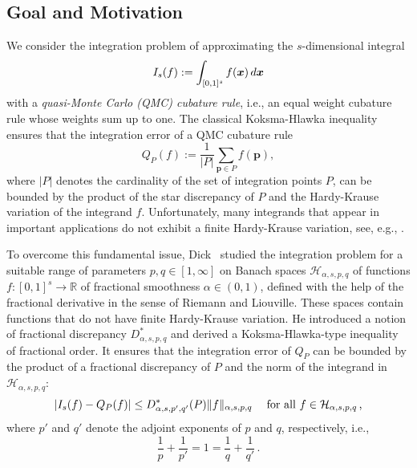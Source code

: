 \documentclass[12pt]{article}
\newcommand{\bsx}{\boldsymbol{x}}
\newcommand{\bsp}{\boldsymbol{p}}
\newcommand{\RR}{\mathbb{R}}
\newcommand{\mig}[1]{\textcolor{blue}{#1}}
\begin{document}


\subsection{Goal and Motivation}


We consider the integration problem of approximating the $s$-dimensional integral
\begin{equation}\label{eq:I_s}
I_s(f) := \int_{[0,1]^s} f(\bsx) \, {\rm}d \bsx
\end{equation}
with a \emph{quasi-Monte Carlo (QMC) cubature rule}, i.e., an equal weight cubature rule whose weights sum up to one. The classical Koksma-Hlawka inequality 
ensures that the integration error of a QMC cubature rule 
\begin{equation}\label{eq:qmc_cub}
Q_P(f) := \frac{1}{|P|} \sum_{\bsp\in P} f(\bsp),
\end{equation}
where $|P|$ denotes the cardinality of the set of integration points $P$, 
can be bounded by the product of the star discrepancy of $P$ and the Hardy-Krause variation of the integrand $f$. Unfortunately, many integrands that appear in important applications do not exhibit a finite Hardy-Krause variation, see, e.g., \cite{Owen05}.

To overcome this fundamental issue, %
Dick~\cite{D08} studied the  integration problem for a suitable range of parameters $p,q \in [1,\infty]$ on Banach spaces $\mathcal{H}_{\alpha, s, p,q}$ of functions $f: [0,1]^s\to \RR$ of fractional smoothness $\alpha \in (0,1)$, defined with the help of the fractional derivative in the sense of Riemann and Liouville. These spaces contain functions that do not have finite Hardy-Krause variation. 
He introduced a notion of fractional discrepancy $D^*_{\alpha,s,p,q}$ and derived a Koksma-Hlawka-type inequality of fractional order. It ensures that the integration error 
of $Q_P$ 
can be bounded by the product of a fractional discrepancy of $P$ and the norm of the integrand in
$\mathcal{H}_{\alpha, s, p,q}$:
$$ |I_s(f) - Q_P(f)| \le  D^*_{\alpha,s,p',q'}(P) \|f\|_{\alpha,s,p,q}
\hspace{3ex}\text{for all $f\in \mathcal{H}_{\alpha, s, p,q}$\,,}$$
where $p'$ and $q'$ denote the adjoint exponents of $p$ and $q$, respectively, i.e.,
$$
\frac{1}{p} + \frac{1}{p'} = 1 = \frac{1}{q} + \frac{1}{q'}\,.
$$
\end{document}
